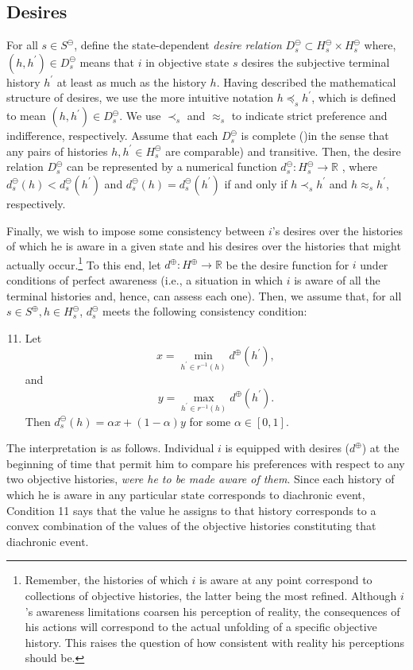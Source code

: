 \documentclass[
11pt,
titlepage,
reqno,
]{article}%
\theoremstyle{definition}
\begin{document}
\subsection{Desires} \label{sec: desires}
For all $s\in S^\ominus$, define the state-dependent \textit{desire relation}    $D^\ominus_s\subset H^\ominus_s\times H^\ominus_s$ where, $(h,h^{\prime})\in D^\ominus_s$ means that  $i$ in objective state $s$ desires the subjective terminal history $h^{\prime}$ at least as much as the history $h$. 
Having described the mathematical structure of desires, we use the more intuitive notation $h\preceq_s h^{\prime}$, which is defined to mean $(h,h^{\prime})\in D^\ominus_s$. 
We use $\prec_s$ and $\approx_s$ to indicate strict preference and indifference, respectively. 
Assume that each $D^\ominus_s$ is complete ()in the sense that any pairs of histories $h,h^{\prime}\in H^\ominus_s$ are comparable) and transitive. 
Then, the desire relation $D^\ominus_s$ can be represented by a numerical function $d^\ominus_s:H^\ominus_s\rightarrow \mathbb{R}$ , where $d^\ominus_s(h)< d^\ominus_s(h^\prime)$ and $d^\ominus_s(h)= d^\ominus_s(h^\prime)$ if and only if  $h\prec_s h^{\prime}$ and $h\approx_s h^{\prime}$, respectively.

Finally, we wish to impose some consistency between $i$'s desires over the histories of which he is aware in a given state and his desires over the histories that might actually occur.\footnote
{
	Remember, the histories of which $i$ is aware at any point correspond to collections of objective histories, the latter being the most refined. 
	Although $i$'s awareness limitations coarsen his perception of reality, the consequences of his actions will correspond to the actual unfolding of a specific objective history. 
	This raises the question of how consistent with reality his perceptions should be.
}
To this end, let $d^\oplus:H^\oplus\rightarrow \mathbb{R}$ be the desire function for $i$ under conditions of perfect awareness (i.e., a situation in which $i$ is aware of all the terminal histories and, hence, can assess each one).
Then, we assume that, for all $s\in S^\oplus,h\in H^\ominus_s$, $d^\ominus_s$ meets the following consistency condition:
\begin{enumerate}
	\setcounter{enumi}{10}
	\item Let 
	\[
		x=\min_{h^\prime\in r^{-1}(h)}d^\oplus(h^\prime),
	\]
	 and  
	 \[
	 	y=\max_{h^\prime\in r^{-1}(h)}d^\oplus(h^\prime).
	 \]
	 Then $d^\ominus_s(h)=\alpha x + (1-\alpha)y$ for some $\alpha\in[0,1]$. 
\end{enumerate}
The interpretation is as follows. Individual $i$ is equipped with desires ($d^\oplus$) at the beginning of time that permit him to compare his preferences with respect to any two objective histories, \textit{were he to be made aware of them}.
Since each history of which he is aware in any particular state corresponds to diachronic event, Condition 11 says that the value he assigns to that history corresponds to a convex combination of the values of the objective histories constituting that diachronic event. 
\end{document}
